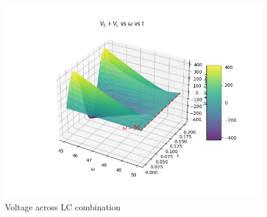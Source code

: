 \documentclass[journal,12pt,twocolumn]{IEEEtran}
\begin{document}
\begin{figure}[h]
     \centering
     \includegraphics[width=\columnwidth]{ncert-physics/12/7/11/figs/LCvoltage.png}
     \caption{Voltage across LC combination}
     \label{217.fig.4}
\end{figure}
\end{document}
